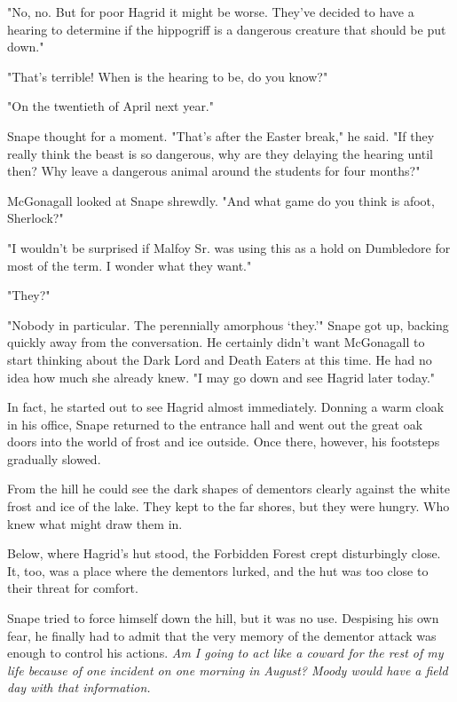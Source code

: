 "No, no. But for poor Hagrid it might be worse. They've decided to have a hearing to determine if the hippogriff is a dangerous creature that should be put down."

"That's terrible! When is the hearing to be, do you know?"

"On the twentieth of April next year."

Snape thought for a moment. "That's after the Easter break," he said. "If they really think the beast is so dangerous, why are they delaying the hearing until then? Why leave a dangerous animal around the students for four months?"

McGonagall looked at Snape shrewdly. "And what game do you think is afoot, Sherlock?"

"I wouldn't be surprised if Malfoy Sr. was using this as a hold on Dumbledore for most of the term. I wonder what they want."

"They?"

"Nobody in particular. The perennially amorphous `they.'" Snape got up, backing quickly away from the conversation. He certainly didn't want McGonagall to start thinking about the Dark Lord and Death Eaters at this time. He had no idea how much she already knew. "I may go down and see Hagrid later today."


\sbreak

In fact, he started out to see Hagrid almost immediately. Donning a warm cloak in his office, Snape returned to the entrance hall and went out the great oak doors into the world of frost and ice outside. Once there, however, his footsteps gradually slowed.

From the hill he could see the dark shapes of dementors clearly against the white frost and ice of the lake. They kept to the far shores, but they were hungry. Who knew what might draw them in.

Below, where Hagrid's hut stood, the Forbidden Forest crept disturbingly close. It, too, was a place where the dementors lurked, and the hut was too close to their threat for comfort.

Snape tried to force himself down the hill, but it was no use. Despising his own fear, he finally had to admit that the very memory of the dementor attack was enough to control his actions. \emph{Am I going to act like a coward for the rest of my life because of one incident on one morning in August? Moody would have a field day with that information.}

